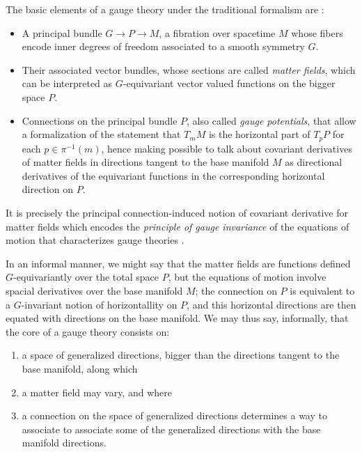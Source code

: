 The basic elements of a gauge theory under the traditional formalism are \cite{Naber}:
    \begin{itemize}
        
    \item A principal bundle $G \to P \to M$, a fibration over spacetime $M$ whose fibers encode inner degrees of freedom associated to a smooth symmetry $G$.
    
    \item Their associated vector bundles, whose sections are called \emph{matter fields}, which can be interpreted as $G$-equivariant vector valued functions on the bigger space $P$.
    
    \item Connections on the principal bundle $P$, also called \emph{gauge potentials}, that allow a formalization of the statement that $T_m M$ is the horizontal part of $T_p P$ for each $p \in \pi^{-1}(m)$, hence making possible to talk about covariant derivatives of matter fields in directions tangent to the base manifold $M$ as directional derivatives of the equivariant functions in the corresponding horizontal direction on $P$.
    
    \end{itemize}
It is precisely the principal connection-induced notion of covariant derivative for matter fields which encodes the \emph{principle of gauge invariance} of the equations of motion that characterizes gauge theories \cite{Bleecker1982}. 

In an informal manner, we might say that the matter fields are functions defined $G$-equivariantly over the total space $P$, but the equations of motion involve spacial derivatives over the base manifold $M$; the connection on $P$ is equivalent to a $G$-invariant notion of horizontallity on $P$, and this horizontal directions are then equated with directions on the base manifold. We may thus say, informally, that the core of a gauge theory consists on:
\begin{enumerate}
    \item a space of generalized directions, bigger than the directions tangent to the base manifold, along which 
    
    \item a matter field may vary, and where 
    
    \item a connection on the space of generalized directions determines a way to associate to associate some of the generalized directions with the base manifold directions.
\end{enumerate} 

